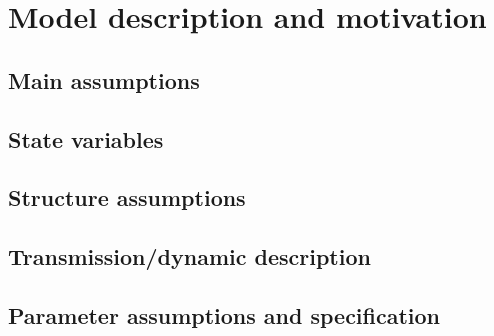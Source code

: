 \section{Model description and motivation}
\subsection{Main assumptions}
\subsection{State variables}
\subsection{Structure assumptions}
\subsection{Transmission/dynamic description}
\subsection{Parameter assumptions and specification}
